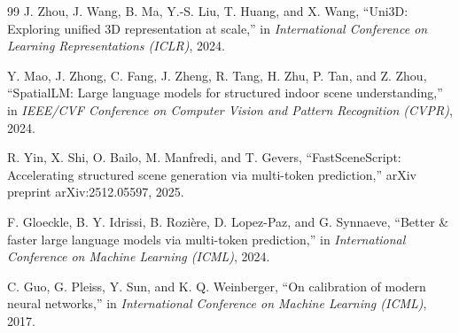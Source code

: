 \documentclass[12pt]{article}
\begin{document}
\begin{thebibliography}{99}
 J. Zhou, J. Wang, B. Ma, Y.-S. Liu, T. Huang, and X. Wang,
``Uni3D: Exploring unified 3D representation at scale,'' in \emph{International
Conference on Learning Representations (ICLR)}, 2024.

 Y. Mao, J. Zhong, C. Fang, J. Zheng, R. Tang, H. Zhu,
P. Tan, and Z. Zhou, ``SpatialLM: Large language models for structured indoor
scene understanding,'' in \emph{IEEE/CVF Conference on Computer Vision and
Pattern Recognition (CVPR)}, 2024.

 R. Yin, X. Shi, O. Bailo, M. Manfredi, and
T. Gevers, ``FastSceneScript: Accelerating structured scene generation via
multi-token prediction,'' arXiv preprint arXiv:2512.05597, 2025.

 F. Gloeckle, B. Y. Idrissi, B. Rozi\`ere, D. Lopez-Paz, and
G. Synnaeve, ``Better \& faster large language models via multi-token
prediction,'' in \emph{International Conference on Machine Learning (ICML)},
2024.

 C. Guo, G. Pleiss, Y. Sun, and K. Q. Weinberger, ``On
calibration of modern neural networks,'' in \emph{International Conference on
Machine Learning (ICML)}, 2017.

\end{thebibliography}
\end{document}
